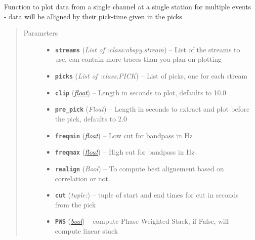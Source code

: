 \documentclass[a4paper,10pt,english]{sphinxmanual}
\begin{document}
\begin{fulllineitems}
\label{submodules/utils.EQcorrscan_plotting:EQcorrscan_plotting.multi_event_singlechan}
Function to plot data from a single channel at a single station for multiple
events - data will be alligned by their pick-time given in the picks
\begin{quote}\begin{description}
\item[{Parameters}] \leavevmode\begin{itemize}
\item {} 
\textbf{\texttt{streams}} (\emph{List of :class:obspy.stream}) -- List of the streams to use, can contain more traces than        you plan on plotting

\item {} 
\textbf{\texttt{picks}} (\emph{List of :class:PICK}) -- List of picks, one for each stream

\item {} 
\textbf{\texttt{clip}} (\href{https://docs.python.org/library/functions.html\#float}{\emph{float}}) -- Length in seconds to plot, defaults to 10.0

\item {} 
\textbf{\texttt{pre\_pick}} (\emph{Float}) -- Length in seconds to extract and plot before the pick,        defaults to 2.0

\item {} 
\textbf{\texttt{freqmin}} (\href{https://docs.python.org/library/functions.html\#float}{\emph{float}}) -- Low cut for bandpass in Hz

\item {} 
\textbf{\texttt{freqmax}} (\href{https://docs.python.org/library/functions.html\#float}{\emph{float}}) -- High cut for bandpass in Hz

\item {} 
\textbf{\texttt{realign}} (\emph{Bool}) -- To compute best alignement based on correlation or not.

\item {} 
\textbf{\texttt{cut}} (\emph{tuple:}) -- tuple of start and end times for cut in seconds from the pick

\item {} 
\textbf{\texttt{PWS}} (\href{https://docs.python.org/library/functions.html\#bool}{\emph{bool}}) -- compute Phase Weighted Stack, if False, will compute linear stack


\end{itemize}
\end{description}
\end{quote}
\end{fulllineitems}
\end{document}
